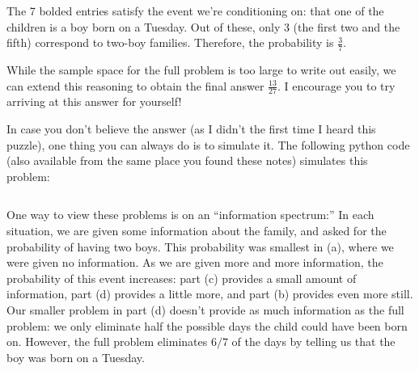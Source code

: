\documentclass[12pt]{article}
\begin{document}
{\begin{enumerate}[(a)]
            The 7 bolded entries satisfy the event we're conditioning on: that
            one of the children is a boy born on a Tuesday. Out of these, only
            3 (the first two and the fifth) correspond to two-boy families.
            Therefore, the probability is $\frac{3}{7}$.

            While the sample space for the full problem is too large to write
            out easily, we can extend this reasoning to obtain the final answer
            $\frac{13}{27}$. I encourage you to try arriving at this answer for
            yourself!

    \end{enumerate}
    In case you don't believe the answer (as I didn't the first time I
    heard this puzzle), one thing you can always do is to simulate it.
    The following python code (also available from the same place you
    found these notes) simulates this problem:

    \inputminted[linenos,frame=lines,framesep=1mm]{python}{probability.py}
    One way to view these problems is on an ``information spectrum:'' In each
    situation, we are given some information about the family, and asked for
    the probability of having two boys. This probability was smallest in (a),
    where we were given no information. As we are given more and
    more information, the probability of this event increases: part (c)
    provides a small amount of information, part (d) provides a little more,
    and part (b) provides even more still. Our smaller problem in part (d)
    doesn't provide as much information as the full problem: we only eliminate
    half the possible days the child could have been born on. However, the full
    problem eliminates $6/7$ of the days by telling us that the boy was born on
    a Tuesday.}
\end{document}
